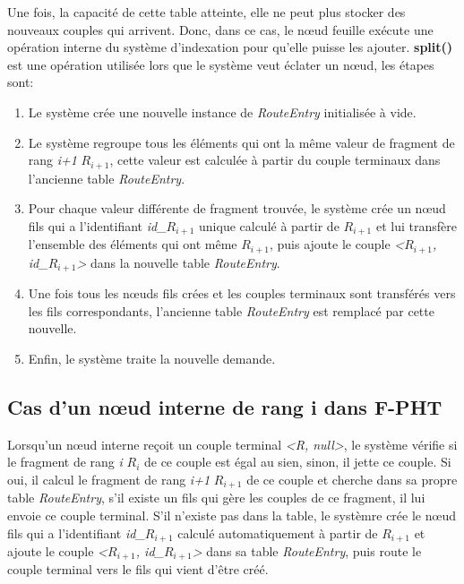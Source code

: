 \documentclass[a4paper,11pt]{report}
\begin{document}
	Une fois, la capacité de cette table atteinte, elle ne peut plus stocker des nouveaux couples qui arrivent. Donc, dans ce cas, le nœud feuille exécute une opération interne du système d'indexation pour qu'elle puisse les ajouter. \textbf{split()} est une opération utilisée lors que le système veut éclater un nœud, les étapes sont:
	\begin{enumerate}
		\item Le système crée une nouvelle instance de \textit{RouteEntry} initialisée à vide.
		\item Le système regroupe tous les éléments qui ont la même valeur de fragment de rang \textit{i+1} \textit{$R_{i+1}$}, cette valeur est calculée à partir du couple terminaux dans l'ancienne table \textit{RouteEntry}.
		\item Pour chaque valeur différente de fragment trouvée, le système crée un nœud fils qui a l'identifiant \textit{id\_$R_{i+1}$} unique calculé à partir de \textit{$R_{i+1}$} et lui transfère l'ensemble des éléments qui ont même \textit{$R_{i+1}$}, puis ajoute le couple \textit{<$R_{i+1}$, id\_$R_{i+1}$>} dans la nouvelle table \textit{RouteEntry}.
		\item Une fois tous les nœuds fils crées et les couples terminaux sont transférés vers les fils correspondants, l'ancienne table \textit{RouteEntry} est remplacé par cette nouvelle.
		\item Enfin, le système traite la nouvelle demande.
	\end{enumerate}
	
\subsection{Cas d'un nœud interne de rang i dans F-PHT}
	Lorsqu'un nœud interne reçoit un couple terminal \textit{<R, null>}, le système vérifie si le fragment de rang \textit{i} \textit{$R_{i}$} de ce couple est égal au sien, sinon, il jette ce couple. Si oui, il calcul le fragment de rang \textit{i+1} \textit{$R_{i+1}$} de ce couple et cherche dans sa propre table \textit{RouteEntry}, s'il existe un fils qui gère les couples de ce fragment, il lui envoie ce couple terminal. S'il n'existe pas dans la table, le systèmre crée le nœud fils qui a l'identifiant \textit{id\_$R_{i+1}$} calculé automatiquement à partir de \textit{$R_{i+1}$} et ajoute le couple \textit{<\textit{$R_{i+1}$}, \textit{id\_$R_{i+1}$}>} dans sa table \textit{RouteEntry}, puis route le couple terminal vers  le fils qui vient d'être créé.
	
\end{document}
